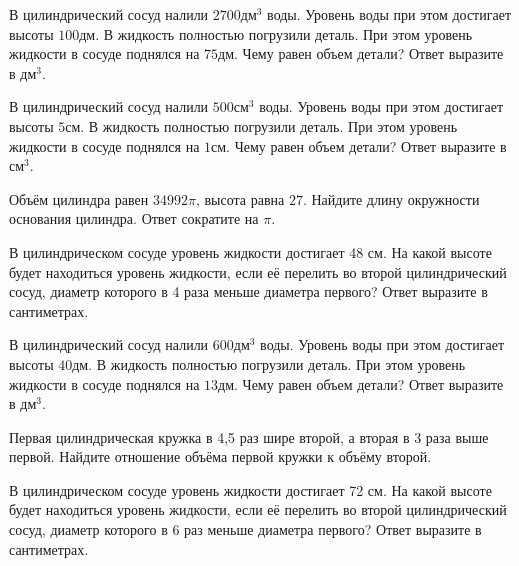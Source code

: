 \documentclass[4apaper]{article}
\begin{document}
\begin{taskBN}{72}
В цилиндрический сосуд налили $2700\mbox{дм}^3$ воды. Уровень воды при этом достигает высоты $100$дм. В жидкость полностью погрузили деталь. При этом уровень жидкости в сосуде поднялся на $75$дм. Чему равен объем детали? Ответ выразите в $\mbox{дм}^3$.
\end{taskBN}

\begin{taskBN}{73}
В цилиндрический сосуд налили $500\mbox{см}^3$ воды. Уровень воды при этом достигает высоты $5$см. В жидкость полностью погрузили деталь. При этом уровень жидкости в сосуде поднялся на $1$см. Чему равен объем детали? Ответ выразите в $\mbox{см}^3$.
\end{taskBN}

\begin{taskBN}{74}
Объём цилиндра равен $34992\pi$, высота равна $27$. Найдите длину окружности основания цилиндра. Ответ сократите на $\pi$.
\end{taskBN}

\begin{taskBN}{75}
В цилиндрическом сосуде уровень жидкости достигает 48 см. На какой высоте будет находиться уровень жидкости, если её перелить во второй цилиндрический сосуд, диаметр которого в 4 раза меньше диаметра первого? Ответ выразите в сантиметрах.
\end{taskBN}

\begin{taskBN}{76}
В цилиндрический сосуд налили $600\mbox{дм}^3$ воды. Уровень воды при этом достигает высоты $40$дм. В жидкость полностью погрузили деталь. При этом уровень жидкости в сосуде поднялся на $13$дм. Чему равен объем детали? Ответ выразите в $\mbox{дм}^3$.
\end{taskBN}

\begin{taskBN}{77}
 Первая цилиндрическая кружка в 4,5 раз шире второй, а вторая в 3 раза выше первой. Найдите отношение объёма первой кружки к объёму второй.
\end{taskBN}

\begin{taskBN}{78}
В цилиндрическом сосуде уровень жидкости достигает 72 см. На какой высоте будет находиться уровень жидкости, если её перелить во второй цилиндрический сосуд, диаметр которого в 6 раз меньше диаметра первого? Ответ выразите в сантиметрах.
\end{taskBN}
\end{document}
